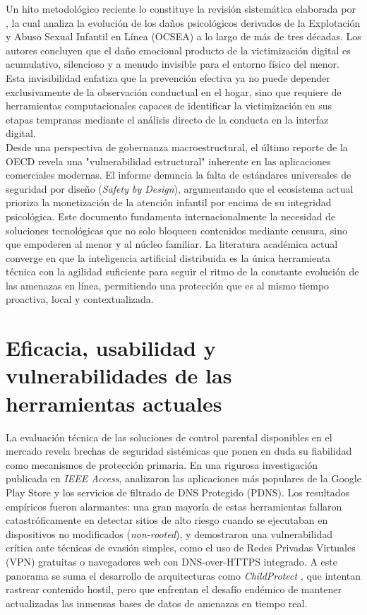 Un hito metodológico reciente lo constituye la revisión sistemática elaborada por \cite{page_psychological_2025}, la cual analiza la evolución de los daños psicológicos derivados de la Explotación y Abuso Sexual Infantil en Línea (OCSEA) a lo largo de más de tres décadas. Los autores concluyen que el daño emocional producto de la victimización digital es acumulativo, silencioso y a menudo invisible para el entorno físico del menor. Esta invisibilidad enfatiza que la prevención efectiva ya no puede depender exclusivamente de la observación conductual en el hogar, sino que requiere de herramientas computacionales capaces de identificar la victimización en sus etapas tempranas mediante el análisis directo de la conducta en la interfaz digital.\\

Desde una perspectiva de gobernanza macroestructural, el último reporte de la OECD \cite{noauthor_full_2025} revela una "vulnerabilidad estructural" inherente en las aplicaciones comerciales modernas. El informe denuncia la falta de estándares universales de seguridad por diseño (\textit{Safety by Design}), argumentando que el ecosistema actual prioriza la monetización de la atención infantil por encima de su integridad psicológica. Este documento fundamenta internacionalmente la necesidad de soluciones tecnológicas que no solo bloqueen contenidos mediante censura, sino que empoderen al menor y al núcleo familiar. La literatura académica actual converge en que la inteligencia artificial distribuida es la única herramienta técnica con la agilidad suficiente para seguir el ritmo de la constante evolución de las amenazas en línea, permitiendo una protección que es al mismo tiempo proactiva, local y contextualizada.\\

\section{Eficacia, usabilidad y vulnerabilidades de las herramientas actuales}

La evaluación técnica de las soluciones de control parental disponibles en el mercado revela brechas de seguridad sistémicas que ponen en duda su fiabilidad como mecanismos de protección primaria. En una rigurosa investigación publicada en \textit{IEEE Access}, \cite{rojas_technical_2025} analizaron las aplicaciones más populares de la Google Play Store y los servicios de filtrado de DNS Protegido (PDNS). Los resultados empíricos fueron alarmantes: una gran mayoría de estas herramientas fallaron catastróficamente en detectar sitios de alto riesgo cuando se ejecutaban en dispositivos no modificados (\textit{non-rooted}), y demostraron una vulnerabilidad crítica ante técnicas de evasión simples, como el uso de Redes Privadas Virtuales (VPN) gratuitas o navegadores web con DNS-over-HTTPS integrado. A este panorama se suma el desarrollo de arquitecturas como \textit{ChildProtect} \cite{ameur_childprotect_2023}, que intentan rastrear contenido hostil, pero que enfrentan el desafío endémico de mantener actualizadas las inmensas bases de datos de amenazas en tiempo real.\\



